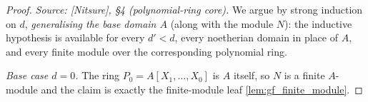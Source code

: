 \begin{proof}
        \leanok
  \textit{Source: [Nitsure], \S4 (polynomial-ring core).}
  We argue by strong induction on \(d\), \emph{generalising the base domain \(A\)} (along
  with the module \(N\)): the inductive hypothesis is available for every \(d' < d\),
  every noetherian domain in place of \(A\), and every finite module over the
  corresponding polynomial ring.

  \emph{Base case \(d = 0\).} The ring \(P_0 = A[X_1, \dots, X_0]\) is \(A\) itself, so
  \(N\) is a finite \(A\)-module and the claim is exactly the finite-module leaf
  \cref{lem:gf_finite_module}.


\end{proof}

